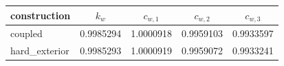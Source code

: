 \begin{ruledtabular}
\begin{tabular}{lcccc}
\toprule
construction & $k_w$ & $c_{w,1}$ & $c_{w,2}$ & $c_{w,3}$ \\
\midrule
coupled & 0.9985294 & 1.0000918 & 0.9959103 & 0.9933597 \\
hard\_exterior & 0.9985293 & 1.0000919 & 0.9959072 & 0.9933241 \\
\bottomrule
\end{tabular}
\end{ruledtabular}
